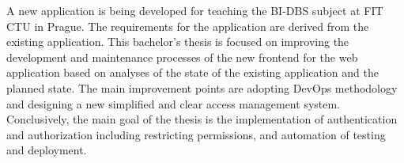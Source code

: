 A new application is being developed for teaching the BI-DBS subject at FIT CTU in Prague. The requirements for the application are derived from the existing application. This bachelor's thesis is focused on improving the development and maintenance processes of the new frontend for the web application based on analyses of the state of the existing application and the planned state. The main improvement points are adopting DevOps methodology and designing a new simplified and clear access management system. Conclusively, the main goal of the thesis is the implementation of authentication and authorization including restricting permissions, and automation of testing and deployment.

